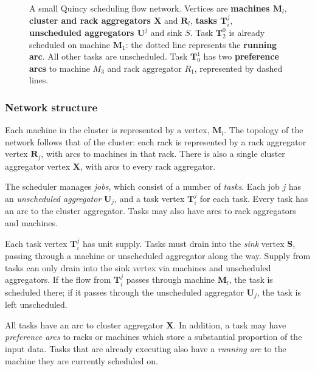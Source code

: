 \begin{figure}
    \centering
    
    \caption[Quincy scheduling flow network]{A small Quincy scheduling flow network. Vertices are \textbf{\color{blue} machines $\mathbf{M}_l$}, \textbf{\color{brown} cluster and rack aggregators $\mathbf{X}$} and \textbf{\color{brown}$\mathbf{R}_l$}, \textbf{\color{green} tasks $\mathbf{T}_i^j$}, \textbf{\color{red} unscheduled aggregators $\mathbf{U}^j$} and sink $S$. Task $\mathbf{T}_2^0$ is already scheduled on machine $\mathbf{M}_1$: the dotted line represents the \textbf{running arc}. All other tasks are unscheduled. Task $\mathbf{T}_0^1$ has two \textbf{preference arcs} to machine $M_3$ and rack aggregator $R_1$, represented by dashed lines.}
    \label{fig:flow-network-no-costs}
\end{figure}

\subsubsection{Network structure}

Each machine in the cluster is represented by a vertex, $\mathbf{M}_l$. The topology of the network follows that of the cluster: each rack is represented by a rack aggregator vertex $\mathbf{R}_j$, with arcs to  machines in that rack. There is also a single cluster aggregator vertex $\mathbf{X}$, with arcs to every rack aggregator.

The scheduler manages \emph{jobs}, which consist of a number of \emph{tasks}. Each job $j$ has an \emph{unscheduled aggregator} $\mathbf{U}_j$, and a task vertex $\mathbf{T}_i^j$ for each task. Every task has an arc to the cluster aggregator. Tasks may also have arcs to rack aggregators and machines.

Each task vertex $\mathbf{T}_i^j$ has unit supply. Tasks must drain into the \emph{sink} vertex $\mathbf{S}$, passing through a machine or unscheduled aggregator along the way\footnotemark.  Supply from tasks can only drain into the sink vertex via machines and unscheduled aggregators. If the flow from $\mathbf{T}_i^j$ passes through machine $\mathbf{M}_l$, the task is scheduled there; if it passes through the unscheduled aggregator $\mathbf{U}_j$, the task is left unscheduled.

All tasks have an arc to cluster aggregator $\mathbf{X}$. In addition, a task may have \emph{preference arcs} to racks or machines which store a substantial proportion of the input data. Tasks that are already executing also have a \emph{running arc} to the machine they are currently scheduled on.

